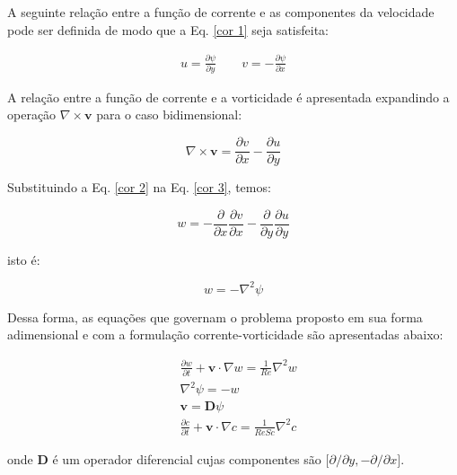 \medskip
A seguinte relação entre a função de corrente
e as componentes da velocidade pode ser definida
de modo que a Eq. \ref{cor 1} seja satisfeita:

\begin{equation} \label{cor 2}
\begin{aligned}
 u = \frac{\partial \psi}{\partial y}
 \qquad
 v = - \frac{\partial \psi}{\partial x}
\end{aligned}
\end{equation}

\medskip
A relação entre a função de corrente
e a vorticidade é apresentada expandindo
a operação $\nabla \times \textbf{v}$
para o caso bidimensional:

\begin{equation} \label{cor 3}
 \nabla \times \textbf{v}
 = 
 \frac{\partial v}{\partial x}
 - 
 \frac{\partial u}{\partial y}
\end{equation}

\medskip
\noindent
Substituindo a Eq. \ref{cor 2} na Eq. \ref{cor 3},
temos:

\begin{equation}
 w
 =
 - 
 \frac{\partial}{\partial x} \frac{\partial v}{\partial x}
 -
 \frac{\partial}{\partial y} \frac{\partial u}{\partial y}
\end{equation}

\medskip
\noindent
isto é:

\begin{equation}
 w
 = 
 -
 \nabla^{2} \psi
\end{equation}

\medskip
Dessa forma, as equações que governam o problema proposto
em sua forma adimensional e com a formulação corrente-vorticidade são apresentadas
abaixo:

\begin{align}
& \frac{\partial w}{\partial t}
 +
 \textbf{v} \cdot \nabla w
 =
 \frac{1}{Re} \nabla^{2} w \label{vorticidade}
 \\[10pt] 
& \nabla^{2} \psi
 = 
 - 
 w \label{corrente} \\[10pt]
& \textbf{v} = \textbf{D} \psi \label{continuidade} \\[10pt]
& \frac{\partial c}{\partial t}
 +
 \textbf{v} \cdot \nabla c
 =
 \frac{1}{ReSc} \nabla^{2} c \label{especie quimica}
\end{align}

\medskip
\noindent
onde \textbf{D} é um operador diferencial
cujas componentes são $\big[
\partial / \partial y,
- \partial / \partial x \big]$. 


